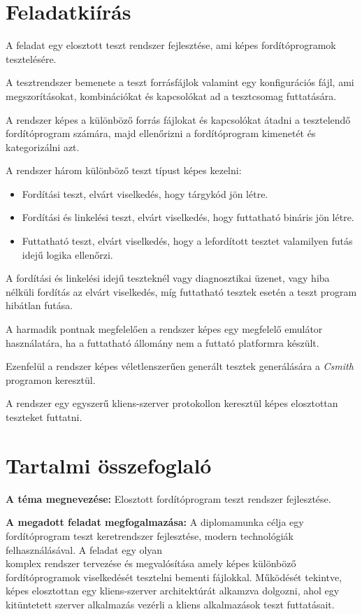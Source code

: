 \chapter*{Feladatkiírás}

A feladat egy elosztott teszt rendszer fejlesztése, ami képes fordítóprogramok tesztelésére.

A tesztrendszer bemenete a teszt forrásfájlok valamint egy konfigurációs fájl, ami megszorításokat, kombinációkat és
kapcsolókat ad a tesztcsomag futtatására.

A rendszer képes a különböző forrás fájlokat és kapcsolókat átadni a tesztelendő fordítóprogram számára, majd
ellenőrizni a fordítóprogram kimenetét és kategorizálni azt.

\noindent
A rendszer három különböző teszt típust képes kezelni:

\begin{itemize}
    \item Fordítási teszt, elvárt viselkedés, hogy tárgykód jön létre.
    \item Fordítási és linkelési teszt, elvárt viselkedés, hogy futtatható bináris jön létre.
    \item Futtatható teszt, elvárt viselkedés, hogy a lefordított tesztet valamilyen futás idejű logika ellenőrzi.
\end{itemize}

A fordítási és linkelési idejű teszteknél vagy diagnosztikai üzenet, vagy hiba nélküli fordítás az elvárt viselkedés,
míg futtatható tesztek esetén a teszt program hibátlan futása.

A harmadik pontnak megfelelően a rendszer képes egy megfelelő emulátor használatára, ha a futtatható állomány nem a
futtató platformra készült.

Ezenfelül a rendszer képes véletlenszerűen generált tesztek generálására a \textit{Csmith} programon keresztül.

A rendszer egy egyszerű kliens-szerver protokollon keresztül képes elosztottan teszteket futtatni.

\chapter*{Tartalmi összefoglaló}

\noindent
\textbf{A téma megnevezése:} Elosztott fordítóprogram teszt rendszer fejlesztése.

\noindent
\textbf{A megadott feladat megfogalmazása:} A diplomamunka célja egy fordítóprogram teszt keretrendszer fejlesztése,
modern technológiák felhasználásával. A feladat egy olyan \\ komplex rendszer
tervezése és megvalósítása amely képes különböző fordítóprogramok viselkedését tesztelni bementi fájlokkal. Működését
tekintve, képes elosztottan egy kliens-szerver architektúrát alkamzva dolgozni, ahol egy kitüntetett szerver alkalmazás
vezérli a kliens alkalmazások teszt futtatásait.

